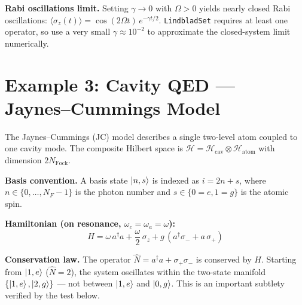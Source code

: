 \documentclass[11pt,a4paper,twoside]{book}
\newcommand{\code}[1]{\texttt{\small#1}}
\theoremstyle{definition}
\theoremstyle{remark}
\begin{document}
\begin{notebox}
  \textbf{Rabi oscillations limit.} Setting $\gamma \to 0$ with $\Omega > 0$
  yields nearly closed Rabi oscillations: $\langle\sigma_z(t)\rangle
  = \cos(2\Omega t)\,e^{-\gamma t/2}$.
  \code{LindbladSet} requires at least one operator, so use a very small
  $\gamma \approx 10^{-2}$ to approximate the closed-system limit numerically.
\end{notebox}

\section{Example 3: Cavity QED --- Jaynes--Cummings Model}
\label{sec:ex-cavity-qed}

The Jaynes--Cummings (JC) model describes a single two-level atom
coupled to one cavity mode. The composite Hilbert space is
$\mathcal{H} = \mathcal{H}_{\mathrm{cav}} \otimes \mathcal{H}_{\mathrm{atom}}$
with dimension $2N_{\mathrm{Fock}}$.

\textbf{Basis convention.} A basis state $\ket{n, s}$ is indexed as
$i = 2n + s$, where $n \in \{0,\ldots,N_F - 1\}$ is the photon number
and $s \in \{0 = e, 1 = g\}$ is the atomic spin.

\textbf{Hamiltonian (on resonance, $\omega_c = \omega_a = \omega$):}
\begin{equation}
  H = \omega\,a^\dagger a
    + \frac{\omega}{2}\,\sigma_z
    + g\,(a^\dagger\sigma_- + a\,\sigma_+)
  \label{eq:jc-ham-full}
\end{equation}

\textbf{Conservation law.} The operator $\hat{N} = a^\dagger a + \sigma_+\sigma_-$
is conserved by $H$. Starting from $\ket{1, e}$ ($\hat{N} = 2$),
the system oscillates within the two-state manifold
$\{\ket{1,e}, \ket{2,g}\}$ — not between $\ket{1,e}$ and $\ket{0,g}$.
This is an important subtlety verified by the test below.
\end{document}
